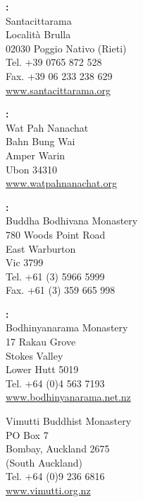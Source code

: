 {\vfill

\textbf{\MakeUppercase{\xItaly}:} \\
Santacittarama\\
Località Brulla\\
02030 Poggio Nativo (Rieti)\\
Tel. +39 0765 872 528\\
Fax. +39 06 233 238 629\\
\href{http://www.santacittarama.org}{www.santacittarama.org}

}

\columnbreak

{\raggedright

\textbf{\MakeUppercase{\xThailand}:} \\
Wat Pah Nanachat\\
Bahn Bung Wai\\
Amper Warin\\
Ubon 34310\\
\href{http://www.watpahnanachat.org}{www.watpahnanachat.org}

\vfill

\textbf{\MakeUppercase{\xAustralia}:} \\
Buddha Bodhivana Monastery\\
780 Woods Point Road\\
East Warburton\\
Vic 3799\\
Tel. +61 (3) 5966 5999\\
Fax. +61 (3) 359 665 998

\vfill

\textbf{\MakeUppercase{\xNewZealand}:} \\
Bodhinyanarama Monastery\\
17 Rakau Grove\\
Stokes Valley\\
Lower Hutt 5019\\
Tel. +64 (0)4 563 7193\\
\href{http://www.bodhinyanarama.net.nz}{www.bodhinyanarama.net.nz}

Vimutti Buddhist Monastery\\
PO Box 7\\
Bombay, Auckland 2675\\
(South Auckland)\\
Tel. +64 (0)9 236 6816\\
\href{http://www.vimutti.org.nz}{www.vimutti.org.nz}

}
